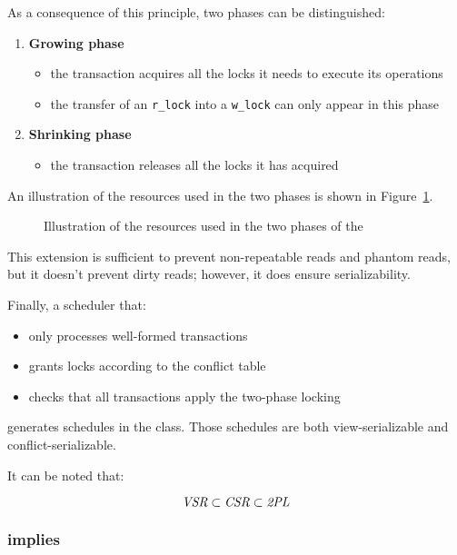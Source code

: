 \documentclass[english]{article}
\begin{document}
As a consequence of this principle, two phases can be distinguished:

\begin{enumerate}
  \item \textbf{Growing phase}
        \begin{itemize}
          \item the transaction acquires all the locks it needs to execute its operations
          \item the transfer of an \texttt{r\_lock} into a \texttt{w\_lock} can only appear in this phase
        \end{itemize}
  \item \textbf{Shrinking phase}
        \begin{itemize}
          \item the transaction releases all the locks it has acquired
        \end{itemize}
\end{enumerate}

An illustration of the resources used in the two phases is shown in Figure~\ref{fig:resources-use-phases-two-phases-locking}.

\begin{figure}[htbp]
  \centering
  \bigskip
  \caption{Illustration of the resources used in the two phases of the \TPL}
  \label{fig:resources-use-phases-two-phases-locking}
  \bigskip
\end{figure}

This extension is sufficient to prevent non-repeatable reads and phantom reads, but it doesn't prevent dirty reads;
however, it does ensure serializability.

\bigskip
Finally, a scheduler that:

\begin{itemize}
  \item only processes well-formed transactions
  \item grants locks according to the conflict table
  \item checks that all transactions apply the two-phase locking
\end{itemize}

generates schedules in the \TPL class.
Those schedules are both view-serializable and conflict-serializable.

It can be noted that:

\[ \textit{VSR} \subset \textit{CSR} \subset \textit{2PL} \]

\subsubsection{\TPL implies \CSR}
\end{document}

